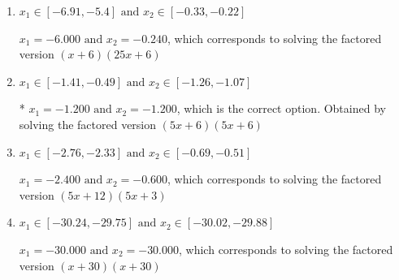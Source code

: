 \documentclass{extbook}[14pt]
\begin{document}
\begin{enumerate}
{\begin{enumerate}[label=\Alph*.]
$x_1 = -3.600 \text{ and } x_2 = -0.400$, which corresponds to solving the factored version $(5x + 18)(5x + 2)$
\item \( x_1 \in [-6.91, -5.4] \text{ and } x_2 \in [-0.33, -0.22] \)

$x_1 = -6.000 \text{ and } x_2 = -0.240$, which corresponds to solving the factored version $(x + 6)(25x + 6)$
\item \( x_1 \in [-1.41, -0.49] \text{ and } x_2 \in [-1.26, -1.07] \)

* $x_1 = -1.200 \text{ and } x_2 = -1.200$, which is the correct option. Obtained by solving the factored version $(5x + 6)(5x + 6)$
\item \( x_1 \in [-2.76, -2.33] \text{ and } x_2 \in [-0.69, -0.51] \)

$x_1 = -2.400 \text{ and } x_2 = -0.600$, which corresponds to solving the factored version $(5x + 12)(5x + 3)$
\item \( x_1 \in [-30.24, -29.75] \text{ and } x_2 \in [-30.02, -29.88] \)

$x_1 = -30.000 \text{ and } x_2 = -30.000$, which corresponds to solving the factored version $(x + 30)(x + 30)$
\end{enumerate}

}
\end{enumerate}
\end{document}
